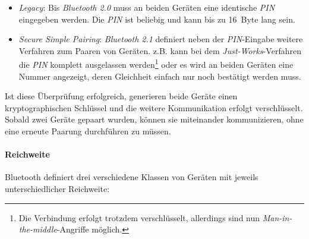                 \begin{itemize}
                    \item{\emph{Legacy}:} Bis \emph{Bluetooth 2.0} muss an beiden Geräten eine identische \emph{PIN}
                                   eingegeben werden. Die \emph{PIN} ist beliebig und kann bis zu
                                   16~Byte lang sein.
                    \item{\emph{Secure Simple Pairing}:} \emph{Bluetooth 2.1} definiert neben der \emph{PIN}-Eingabe
                                                  weitere Verfahren zum Paaren von Geräten.
                                                  z.B. kann bei dem \emph{Just-Works}-Verfahren
                                                  die \emph{PIN} komplett ausgelassen werden\footnote{Die
                                                  Verbindung erfolgt trotzdem verschlüsselt,
                                                  allerdings sind nun \emph{Man-in-the-middle}-Angriffe 
                                                  möglich.} oder es wird an beiden Geräten eine
                                                  Nummer angezeigt, deren Gleichheit einfach
                                                  nur noch bestätigt werden muss.
                \end{itemize}

                Ist diese Überprüfung erfolgreich, generieren beide Geräte einen kryptographischen
                Schlüssel und die weitere Kommunikation erfolgt verschlüsselt. Sobald zwei
                Geräte gepaart wurden, können sie miteinander kommunizieren, ohne eine erneute
                Paarung durchführen zu müssen. \cite{Bluetooth}

            \paragraph{Reichweite}
                Bluetooth definiert drei verschiedene Klassen von Geräten mit jeweils
                unterschiedlicher Reichweite:

